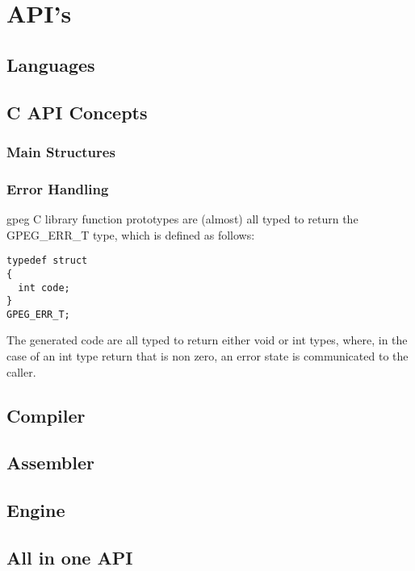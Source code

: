\section{API's}

\subsection{Languages}

\subsection{C API Concepts}

\subsubsection{Main Structures}

\subsubsection{Error Handling}

gpeg C library function prototypes are (almost) all typed to return
the GPEG\_ERR\_T type, which is defined as follows:

\begin{myquote}
\begin{verbatim}
typedef struct
{
  int code;
}
GPEG_ERR_T;
\end{verbatim}
\end{myquote}

The generated code are all typed to return either void or int types,
where, in the case of an int type return that is non zero, an
error state is communicated to the caller.

\subsection{Compiler}

\subsection{Assembler}

\subsection{Engine}

\subsection{All in one API}

